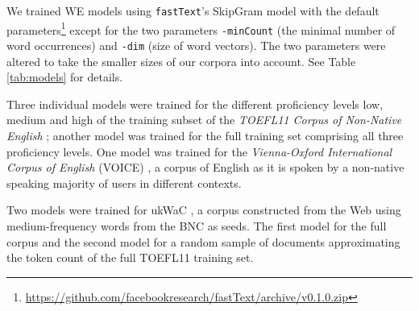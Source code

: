 \documentclass[11pt,a4paper]{article}
\newcommand\fT{\texttt{fastText}\xspace}
\begin{document}
We trained WE models using \fT's SkipGram model with the default parameters\footnote{\url{https://github.com/facebookresearch/fastText/archive/v0.1.0.zip}} except for the two parameters \texttt{-minCount} (the minimal number of word occurrences) and \texttt{-dim} (size of word vectors). 
The two parameters were altered to take the smaller sizes of our corpora into account. See Table \ref{tab:models} for details.

Three individual models were trained for the different proficiency levels low, medium and high of the training subset of the \emph{TOEFL11 Corpus of Non-Native English} \cite{ETS2:ETS202331}; another model was trained for the full training set comprising all three proficiency levels. One model was trained for the \emph{Vienna-Oxford International Corpus of English} (VOICE) \cite{Seidlhofer2013TheVOICE}, a corpus of English as it is spoken by a non-native speaking majority of users in different contexts.

Two models were trained for ukWaC \cite{wackycorpora2009}, a corpus constructed from the Web using medium-frequency words from the BNC as seeds.
The first model for the full corpus and the second model for a random sample of documents approximating the token count of the full TOEFL11 training set.
\end{document}
